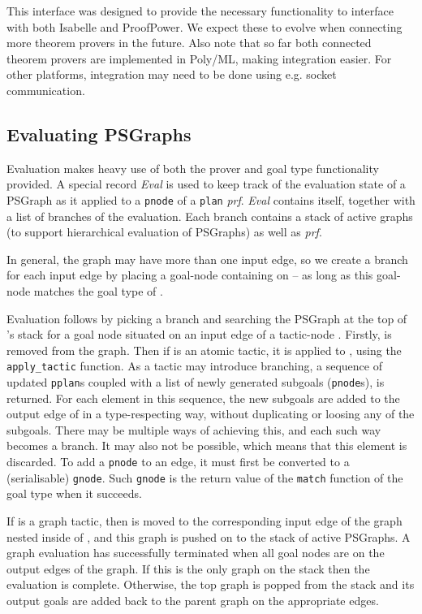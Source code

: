 \documentclass[submission,copyright,creativecommons]{eptcs}
\begin{document}
This interface was designed to provide the necessary functionality to interface with both Isabelle and ProofPower. We expect these to evolve when connecting more theorem provers in the future. Also note that so far both connected theorem provers are implemented in Poly/ML, making integration easier. For other platforms, integration may need to be done using e.g. socket communication.

\vspace{-5pt}
\subsection{Evaluating PSGraphs}
\vspace{-5pt}

Evaluation makes heavy use of both the prover and goal type functionality provided. A special record \textit{Eval} is used to keep track of the evaluation state of a PSGraph  as it applied to a \texttt{pnode}  of a \texttt{plan} \textit{prf}. \textit{Eval} contains  itself, together with a list of branches of the evaluation. Each branch contains a stack of active graphs (to support hierarchical evaluation of PSGraphs) as well as \textit{prf}.

In general, the graph  may have more than one input edge, so we create a branch for each input edge  by placing a goal-node containing  on  -- as long as this goal-node matches the goal type of .


Evaluation follows by picking a branch  and searching the PSGraph at the top of 's stack for a goal node  situated on an input edge of a tactic-node . Firstly,  is removed from the graph. Then if  is an atomic tactic,  it is applied to , using the \texttt{apply\_tactic} function. 
As a tactic may introduce branching, a sequence of updated \texttt{pplan}s coupled with a list  of newly generated subgoals (\texttt{pnode}s), is returned.  For each element in this sequence, the new subgoals are added to the output edge of  in a type-respecting way, without duplicating or loosing any of the subgoals. There may be multiple ways of achieving this, and each such way becomes a branch. It may also not be possible, which 
means that this element is discarded. To add a \texttt{pnode} to an edge, it must first be converted to a (serialisable) \texttt{gnode}. Such \texttt{gnode} is the return value of the \texttt{match} function of the goal type when it succeeds.

If  is a graph tactic, then  is moved to the corresponding input edge of the graph nested inside of , and this graph is pushed on to the stack of active PSGraphs. A graph evaluation has successfully terminated when all goal nodes are on the output edges of the graph. If this is the only graph on the stack then the evaluation is complete. Otherwise, the top graph is popped from the stack and its output goals are added back to the parent graph on the appropriate edges.
\end{document}
